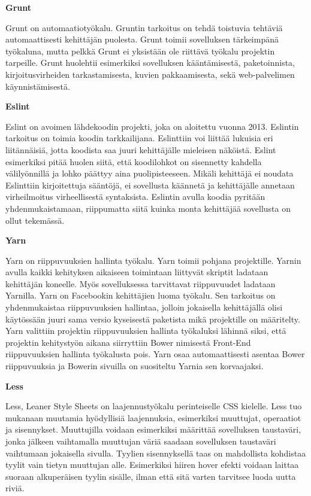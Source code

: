 \documentclass{tktltiki}
\begin{document}
\textbf{Grunt}

Grunt on automaatiotyökalu. Gruntin tarkoitus on tehdä toistuvia tehtäviä automaattisesti kehittäjän puolesta. Grunt toimii sovelluksen tärkeimpänä työkaluna, mutta pelkkä Grunt ei yksistään ole riittävä työkalu projektin tarpeille. Grunt huolehtii esimerkiksi sovelluksen kääntämisestä, paketoinnista, kirjoitusvirheiden tarkastamisesta, kuvien pakkaamisesta, sekä web-palvelimen käynnistämisestä. 

\textbf{Eslint}

Eslint on avoimen lähdekoodin projekti, joka on aloitettu vuonna 2013. Eslintin tarkoitus on toimia koodin tarkkailijana. Eslinttiin voi liittää lukuisia eri liitännäisiä, jotta koodista saa juuri kehittäjälle mieleisen näköistä. Eslint esimerkiksi pitää huolen siitä, että koodilohkot on sisennetty kahdella välilyönnillä ja lohko päättyy aina puolipisteeseen. Mikäli kehittäjä ei noudata Eslinttiin kirjoitettuja sääntöjä, ei sovellusta käännetä ja kehittäjälle annetaan virheilmoitus virheellisestä syntaksista. Eslintin avulla koodia pyritään yhdenmukaistamaan, riippumatta siitä kuinka monta kehittäjää sovellusta on ollut tekemässä. 

\textbf{Yarn}

Yarn on riippuvuuksien hallinta työkalu. Yarn toimii pohjana projektille. Yarnin avulla kaikki kehityksen aikaiseen toimintaan liittyvät skriptit ladataan kehittäjän koneelle. Myös sovelluksessa tarvittavat riippuvuudet ladataan Yarnilla. Yarn on Facebookin kehittäjien luoma työkalu. Sen tarkoitus on yhdenmukaistaa riippuvuuksien hallintaa, jolloin jokaisella kehittäjällä olisi käytössään juuri sama versio kyseisestä paketista mikä projektille on määritelty. Yarn valittiin projektin riippuvuuksien hallinta työkaluksi lähinnä siksi, että projektin kehitystyön aikana siirryttiin Bower nimisestä Front-End riippuvuuksien hallinta työkalusta pois. Yarn osaa automaattisesti asentaa Bower riippuvuuksia ja Bowerin sivuilla on suositeltu Yarnia sen korvaajaksi. 

\textbf{Less}

Less, Leaner Style Sheets on laajennustyökalu perinteiselle CSS kielelle. Less tuo mukanaan muutamia hyödyllisiä laajennuksia, esimerkiksi muuttujat, operaatiot ja sisennykset. Muuttujilla voidaan esimerkiksi määrittää sovelluksen taustaväri, jonka jälkeen vaihtamalla muuttujan väriä saadaan sovelluksen taustaväri vaihtumaan jokaisella sivulla. Tyylien sisennyksellä taas on mahdollista kohdistaa tyylit vain tietyn muuttujan alle. Esimerkiksi hiiren hover efekti voidaan laittaa suoraan alkuperäisen tyylin sisälle, ilman että sitä varten tarvitsee luoda uutta riviä.
\end{document}

